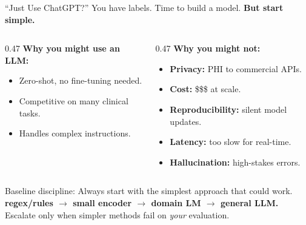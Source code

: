 \documentclass[aspectratio=169,11pt]{beamer}
\begin{document}
\begin{frame}{``Just Use ChatGPT?''}
You have labels. Time to build a model. \textbf{But start simple.}

\vspace{0.2em}
\begin{columns}[T]
\begin{column}{0.47\textwidth}
\small\textbf{Why you might use an LLM:}
\begin{itemize}\setlength\itemsep{0em}
  \item Zero-shot, no fine-tuning needed.
  \item Competitive on many clinical tasks.
  \item Handles complex instructions.
\end{itemize}
\end{column}
\begin{column}{0.47\textwidth}
\small\textbf{Why you might not:}
\begin{itemize}\setlength\itemsep{0em}
  \item \textbf{Privacy:} PHI to commercial APIs.
  \item \textbf{Cost:} \$\$\$ at scale.
  \item \textbf{Reproducibility:} silent model updates.
  \item \textbf{Latency:} too slow for real-time.
  \item \textbf{Hallucination:} high-stakes errors.
\end{itemize}
\end{column}
\end{columns}

\vspace{0.2em}
\alert{Baseline discipline:} Always start with the simplest approach that could work.\\
\textbf{regex/rules $\rightarrow$ small encoder $\rightarrow$ domain LM $\rightarrow$ general LLM.}\\
Escalate only when simpler methods fail on \emph{your} evaluation.
\end{frame}
\end{document}
